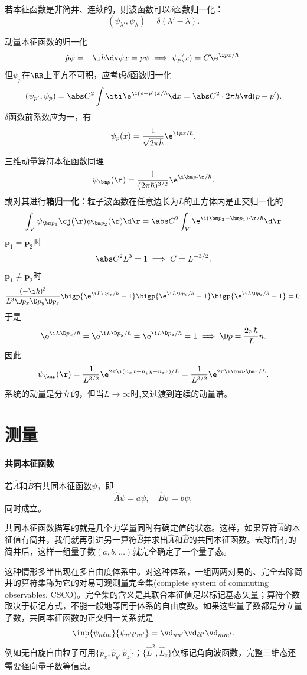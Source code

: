 若本征函数是非简并、连续的，则波函数可以$\delta$函数归一化：%
\[
	(\psi_{\lambda'},\psi_\lambda)=\delta(\lambda'-\lambda).
\]
\begin{example}{动量本征函数的归一化}{}
	\[
		\hat p\psi=-\i\hbar\dv\psi{x}=p\psi\implies\psi_p(x)=C\e^{\i px/\hbar}.
	\]
	但$\psi_p$在$\RR$上平方不可积，应考虑$\delta$函数归一化
	\[
		(\psi_{p'},\psi_p)=\abs C^2\int\iti\e^{\i(p-p')x/\hbar}\d x=\abs C^2\cdot 2\pi\hbar\vd(p-p').
	\]
	$\delta$函数前系数应为一，有
	\[
		\psi_p(x)=\frac1{\sqrt{2\pi\hbar}}\e^{\i px/\hbar}.
	\]
	
	三维动量算符本征函数同理
	\[
		\psi_{\bm p}(\r)=\frac1{(2\pi\hbar)^{3/2}}\e^{\i\bm p\cdot\r/\hbar}.
	\]
	\tcblower
	或对其进行\textbf{箱归一化}：粒子波函数在任意边长为$L$的正方体内是正交归一化的
	\[
		\int_V\psi_{\bm p_1}\cj(\r)\psi_{\bm p_2}(\r)\d\r=\abs C^2\int_V\e^{\i(\bm p_2-\bm p_1)\cdot\r/\hbar}\d\r
	\]
	$\bm p_1=\bm p_2$时
	\[
		\abs C^2L^3=1\implies C=L^{-3/2}.
	\]
	$\bm p_1\neq\bm p_2$时
	\[
		\frac{(-\i\hbar)^3}{L^3\D p_x\D p_y\D p_z}\bigp{\e^{\i L\D p_x/\hbar}-1}\bigp{\e^{\i L\D p_y/\hbar}-1}\bigp{\e^{\i L\D p_z/\hbar}-1}=0.
	\]
	于是
	\[
		\e^{\i L\D p_x/\hbar}=\e^{\i L\D p_y/\hbar}=\e^{\i L\D p_z/\hbar}=1\implies\D p=\frac{2\pi\hbar}Ln.
	\]
	因此
	\[
		\psi_{\bm p}(\r)=\frac1{L^{3/2}}\e^{2\pi\i(n_xx+n_yy+n_zz)/L}=\frac1{L^{3/2}}\e^{2\pi\i\bm n\cdot\bm r/L}.
	\]
	系统的动量是分立的，但当$L\to\infty$时,又过渡到连续的动量谱。
\end{example}
\section{测量}
\paragraph{共同本征函数}
若$\hat A$和$\hat B$有共同本征函数$\psi$，即
\[
	\hat A\psi=a\psi,\quad\hat B\psi=b\psi,
\]
同时成立。

共同本征函数描写的就是几个力学量同时有确定值的状态。这样，如果算符$\hat A$的本征值有简并，我们就再引进另一算符$\hat B$并求出$\hat A$和$\hat B$的共同本征函数。去除所有的简并后，这样一组量子数$(a,b,\ldots)$就完全确定了一个量子态。

这种情形多半出现在多自由度体系中。对这种体系，一组两两对易的、完全去除简并的算符集称为它的对易可观测量完全集(complete system of commuting observables, CSCO)。完全集的含义是其联合本征值足以标记基态矢量；算符个数取决于标记方式，不能一般地等同于体系的自由度数。如果这些量子数都是分立量子数，共同本征函数的正交归一关系就是
\[
	\inp{\psi_{n\ell m}}{\psi_{n'\ell'm'}}=\vd_{nn'}\vd_{\ell\ell'}\vd_{mm'}.
\]
例如无自旋自由粒子可用$\{\hat p_x,\hat p_y,\hat p_z\}$；$\{\hat L^2,\hat L_z\}$仅标记角向波函数，完整三维态还需要径向量子数等信息。

